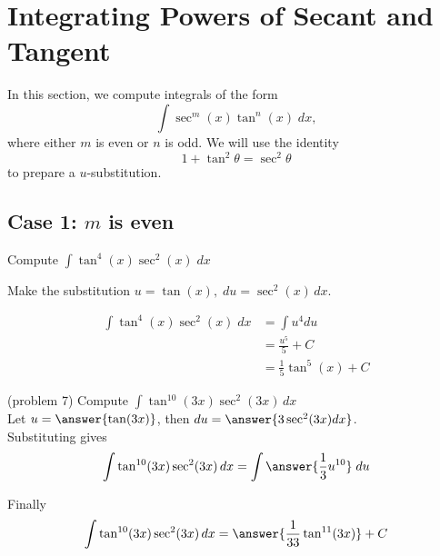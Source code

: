 \documentclass{ximera}
\begin{document}



\section{Integrating Powers of Secant and Tangent}
In this section, we compute integrals of the form
\[
\int \sec^m(x)\tan^n(x) \; dx,
\]
where either $m$ is even or $n$ is odd. We will use the identity
\[
1+\tan^2 \theta = \sec^2 \theta
\]
to prepare a $u$-substitution.


\subsection{Case 1: $m$ is even}
\begin{example}[example 7]
Compute $\displaystyle{\int \tan^4(x) \sec^2(x)\;dx}$

Make the substitution $u = \tan(x), \; du = \sec^2(x) \, dx$.

\begin{align*}
\int \tan^4(x) \sec^2(x)\;dx &= \int u^4 du\\
&=  \frac{u^5}{5} + C  \\
&= \frac15\tan^5(x)  + C
\end{align*}
\end{example} 




\begin{problem}(problem 7)
Compute $\displaystyle{\int \tan^{10}(3x)\sec^2(3x) \, dx}$\\

Let $u = \answer{\tan(3x)}$, \; then $du = \answer{3\sec^2(3x) dx}$.\\

Substituting gives 
\[
\int \tan^{10}(3x)\sec^2(3x) \, dx = \int \answer{\frac13 u^{10}} \; du
\]

Finally
\[
\int \tan^{10}(3x)\sec^2(3x) \, dx = \answer{\frac{1}{33} \tan^{11}(3x)} + C
\]

\end{problem}
\end{document}

